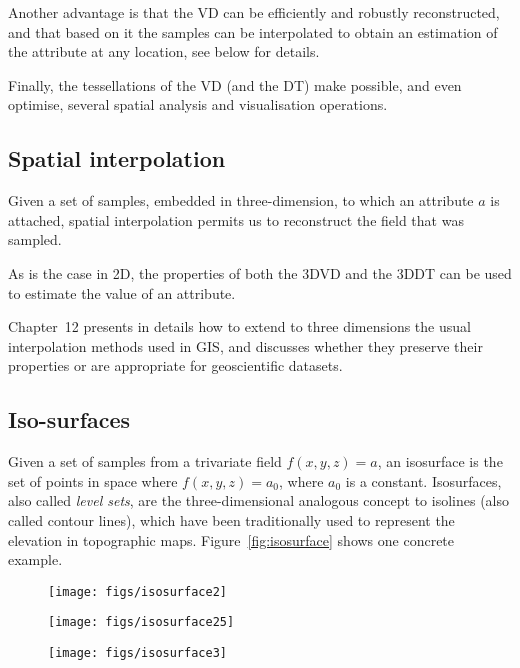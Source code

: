 Another advantage is that the VD can be efficiently and robustly reconstructed, and that based on it the samples can be interpolated to obtain an estimation of the attribute at any location, see below for details.

Finally, the tessellations of the VD (and the DT) make possible, and even optimise, several spatial analysis and visualisation operations.




\subsection{Spatial interpolation}%
\label{sec:interpol}

Given a set of samples, embedded in three-dimension, to which an attribute $a$ is attached, spatial interpolation permits us to reconstruct the field that was sampled.

As is the case in 2D, the properties of both the 3DVD and the 3DDT can be used to estimate the value of an attribute.

Chapter~12 presents in details how to extend to three dimensions the usual interpolation methods used in GIS, and discusses whether they preserve their properties or are appropriate for geoscientific datasets.





\subsection{Iso-surfaces}

Given a set of samples from a trivariate field $f(x,y,z) = a$, an isosurface is the set of points in space where $f(x,y,z) = a_0$, where $a_0$ is a constant. 
Isosurfaces, also called \emph{level sets}, are the three-dimensional analogous concept to isolines (also called contour lines), which have been traditionally used to represent the elevation in topographic maps.
Figure~\ref{fig:isosurface} shows one concrete example.
\begin{figure*}
  \centering
  \begin{subfigure}[b]{0.28\linewidth}
    \centering
    \texttt{[image: figs/isosurface2]}
    \caption{}
  \end{subfigure}%
  \qquad
  \begin{subfigure}[b]{0.28\linewidth}
    \centering
    \texttt{[image: figs/isosurface25]}
    \caption{}
  \end{subfigure}
  \qquad
  \begin{subfigure}[b]{0.28\linewidth}
    \centering
    \texttt{[image: figs/isosurface3]}
    \caption{}
  \end{subfigure}
\caption{An example of an oceanographic dataset where each point has the temperature of the water, and three isosurface extracted (for a value of respectively 2.0, 2.5 and 3.5) from this dataset.}%
\label{fig:isosurface}
\end{figure*}



